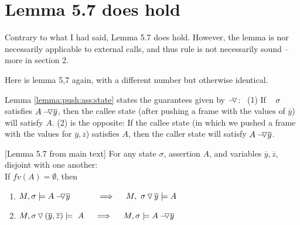 \newcommand{\balance}{\prg{bal}}
\newcommand{\password}{\prg{pwd}}
\newcommand{\myAccount}{\prg{accnt}}

\section{Lemma 5.7 does hold}

Contrary to what I had said, %
 Lemma 5.7 does hold. However, the lemma is nor necessarily applicable to external calls, and thus rule {} is not necessarily sound -- more in section 2.
 
 
 Here is lemma 5,7 again, with a different number but otherwise identical.

 Lemma \ref{lemma:push:ass:state} states the guarantees given by $\pushSymbolAA$: \  (1) If \ %
$\sigma$ satisfies  $\PushAS y A$, then   { the callee state (after pushing a frame with the values of $\overline y$) 
will satisfy $A$}. %
(2) is the opposite: {If the callee state (in which we pushed a frame with the values for $\overline y, \overline z$) satisfies $A$, then the
caller state will satisfy 
$\PushAS {y} {A}$. } %

\begin{lemma} 
\label{lemma:push:ass:state}[Lemma 5.7 from main text]
For any state  $\sigma$, assertion $A$, and variables   $\overline y, \overline z$, disjoint with one another:
\\
If  $fv(A)=\emptyset$, then
\begin{enumerate}
 \item
 \label{lemma:push:ass:state:one}
$M, \sigma \models \PushAS {y} {A}\ \ \ \ \ \ \  \ \ \    \Longrightarrow  \ \ \ \ M,  \PushS {y} {\sigma}   \models A$
\item
\label{lemma:push:ass:state:two}
$M, { \PushSLong {(\overline y, \overline z)} {\sigma} } \models\  A \  \ \ \ \Longrightarrow  \ \ \ \ M,  \sigma \models  \PushAS  {y} {A}$
\end{enumerate}
\end{lemma}


